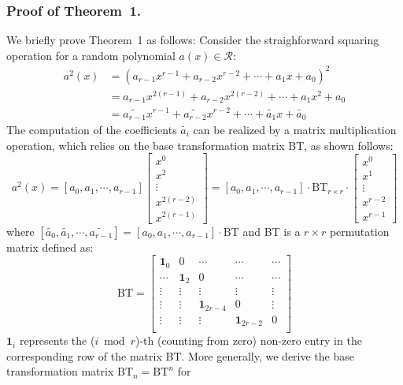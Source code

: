 \documentclass[runningheads]{llncs}
\begin{document}
\subsubsection{Proof of Theorem~1.}
We briefly prove Theorem~1 as follows:
Consider the straighforward squaring operation for a random polynomial $a(x)\in \mathcal{R}$:
\begin{align}
    a^2(x) &= (a_{r-1}x^{r-1}+a_{r-2}x^{r-2}+\cdots + a_{1}x + a_0)^2\\
    &= a_{r-1}x^{2(r-1)}+a_{r-2}x^{2(r-2)}+\cdots + a_1x^2 + a_0\\
    &= \widetilde{a_{r-1}}x^{r-1}+\widetilde{a_{r-2}}x^{r-2}+\cdots + \widetilde{a_{1}}x +\widetilde{a_0}
\end{align}
%
The computation of the coefficients $\widetilde{a_{i}}$ can
be realized by a matrix multiplication operation,
which relies on the base transformation matrix BT, as shown follows:
\[
a^2(x)= [{a_{0}},{a_{1}},\cdots,{a_{r-1}}]\left[ \begin{array}{c}
x^{0} \\
x^{2} \\
\vdots\\
x^{2(r-2)}\\
x^{2(r-1)}
\end{array}
\right ]
=
[{a_0},{a_1},\cdots,{a_{r-1}}]
\cdot \text{BT}_{r\times r} \cdot
\left[ \begin{array}{c}
x^{0} \\
x^{1} \\
\vdots\\
x^{r-2}\\
x^{r-1}
\end{array}
\right ]
\]
where $[\widetilde{a_{0}},\widetilde{a_{1}},\cdots,\widetilde{a_{r-1}}]=[{a_{0}},{a_{1}},\cdots,{a_{r-1}}]
\cdot \text{BT}$ and BT is a $r\times r$ permutation matrix defined as:
\[
\text{BT} =
\left[ \begin{array}{ccccc}
\mathbf{1}_{0}&0&\cdots&\cdots&\cdots  \\
\cdots&\mathbf{1}_{2}&0 &\cdots&\cdots \\
\vdots&\vdots&\vdots&\vdots&\vdots\\
\vdots&\vdots&\mathbf{1}_{2r-4}&0&\vdots\\
\vdots&\vdots&\vdots&\mathbf{1}_{2r-2}&0\\
\end{array}
\right ]
\]
$\mathbf{1}_{i}$ represents the ($i\bmod r$)-th (counting from zero) non-zero entry in the corresponding row of the matrix BT.
%
More generally, we derive the base transformation matrix $\text{BT}_n=\text{BT}^n$ for
\end{document}
